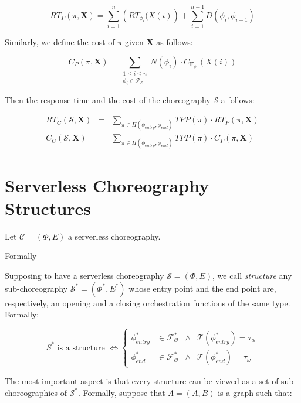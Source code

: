 \documentclass[12pt,a4paper]{report}
\theoremstyle{definition}
\begin{document}
\begin{equation}
	RT_P(\pi, \textbf{X}) = \sum_{i = 1}^n \left( RT_{\phi_i} (X(i) \right)  + \sum_{i = 1}^{n-1} D(\phi_i,\phi_{i+1})
\end{equation}

Similarly, we define the cost of $\pi$ given $\textbf{X}$ as follows:

\begin{equation}
	C_P(\pi, \textbf{X}) = \sum_{\substack{1\le i\le n\\ \phi_i \in \mathscr{F_E}}} N(\phi_i) \cdot C_{\textbf{F}_{\phi_i}} (X(i))
\end{equation}


Then the response time and the cost of the choreography $\mathcal{S}$ a follows:

\begin{eqnarray}
	RT_C(\mathcal{S}, \textbf{X}) & = & \sum_{\pi \in \Pi(\phi_{entry}, \phi_{end})} TPP(\pi) \cdot RT_{P}(\pi, \textbf{X}) \\
	C_C(\mathcal{S}, \textbf{X}) & = & \sum_{\pi \in \Pi(\phi_{entry}, \phi_{end})} TPP(\pi) \cdot C_{P}(\pi, \textbf{X}) 
\end{eqnarray}



\section{Serverless Choreography Structures}

Let $\mathcal{C} = (\Phi,E)$ a serverless choreography. 

Formally


Supposing to have a serverless choreography $\mathcal{S} = (\Phi,E)$, we call \textit{structure} any sub-choreography $\mathcal{S}^*= (\Phi^*,E^*)$ whose entry point and the end point are, respectively, an opening and a closing orchestration functions of the same type. Formally:

\begin{equation}
	S^* \text{ is a structure } \Leftrightarrow \left\{ \begin{array}{rlll}
		\phi_{entry}^* & \in \mathscr{F_O^*} & \wedge & \mathscr{T}(\phi_{entry}^*) = \tau_{\alpha} \\ 
		\phi_{end}^* & \in \mathscr{F_O^*} & \wedge & \mathscr{T}(\phi_{end}^*) = \tau_{\omega}
	\end{array} \right.
\end{equation}

The most important aspect is that every structure can be viewed as a set of sub-choreographies of $\mathcal{S}^*$. Formally, suppose that $\Lambda = (A,B)$ is a graph such that:
\end{document}
